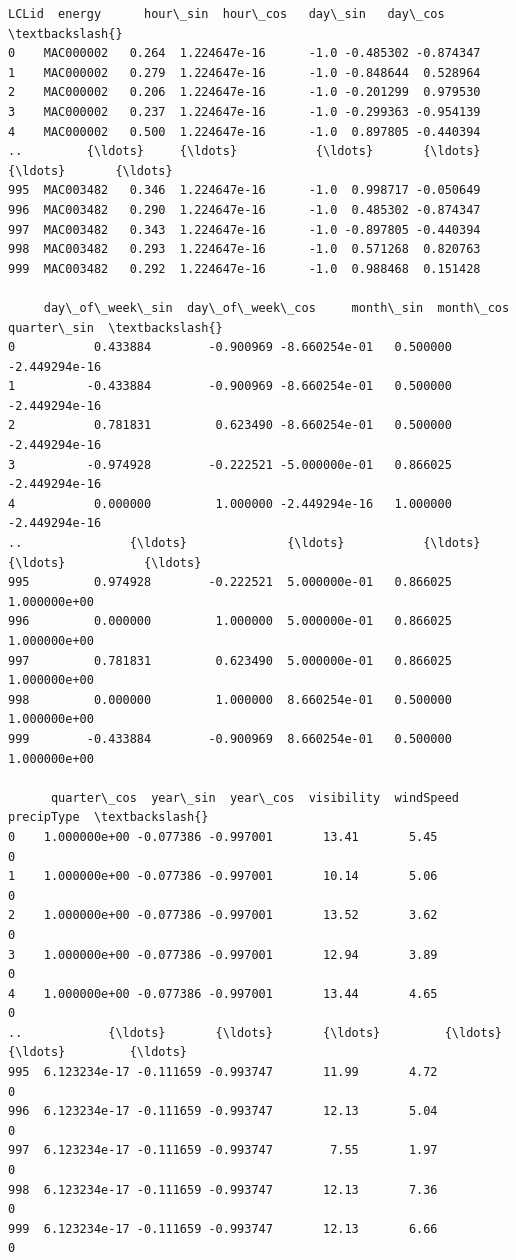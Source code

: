 \documentclass[11pt]{article}
\makeatletter
\newcommand{\boxspacing}{\kern\kvtcb@left@rule\kern\kvtcb@boxsep}
\newcommand{\prompt}[4]{
        {\ttfamily\llap{{\color{#2}[#3]:\hspace{3pt}#4}}\vspace{-\baselineskip}}
    }
\makeatother
\begin{document}
            \begin{tcolorbox}[breakable, size=fbox, boxrule=.5pt, pad at break*=1mm, opacityfill=0]
\prompt{Out}{outcolor}{172}{\boxspacing}
\begin{Verbatim}[commandchars=\\\{\}]
         LCLid  energy      hour\_sin  hour\_cos   day\_sin   day\_cos  \textbackslash{}
0    MAC000002   0.264  1.224647e-16      -1.0 -0.485302 -0.874347
1    MAC000002   0.279  1.224647e-16      -1.0 -0.848644  0.528964
2    MAC000002   0.206  1.224647e-16      -1.0 -0.201299  0.979530
3    MAC000002   0.237  1.224647e-16      -1.0 -0.299363 -0.954139
4    MAC000002   0.500  1.224647e-16      -1.0  0.897805 -0.440394
..         {\ldots}     {\ldots}           {\ldots}       {\ldots}       {\ldots}       {\ldots}
995  MAC003482   0.346  1.224647e-16      -1.0  0.998717 -0.050649
996  MAC003482   0.290  1.224647e-16      -1.0  0.485302 -0.874347
997  MAC003482   0.343  1.224647e-16      -1.0 -0.897805 -0.440394
998  MAC003482   0.293  1.224647e-16      -1.0  0.571268  0.820763
999  MAC003482   0.292  1.224647e-16      -1.0  0.988468  0.151428

     day\_of\_week\_sin  day\_of\_week\_cos     month\_sin  month\_cos   quarter\_sin  \textbackslash{}
0           0.433884        -0.900969 -8.660254e-01   0.500000 -2.449294e-16
1          -0.433884        -0.900969 -8.660254e-01   0.500000 -2.449294e-16
2           0.781831         0.623490 -8.660254e-01   0.500000 -2.449294e-16
3          -0.974928        -0.222521 -5.000000e-01   0.866025 -2.449294e-16
4           0.000000         1.000000 -2.449294e-16   1.000000 -2.449294e-16
..               {\ldots}              {\ldots}           {\ldots}        {\ldots}           {\ldots}
995         0.974928        -0.222521  5.000000e-01   0.866025  1.000000e+00
996         0.000000         1.000000  5.000000e-01   0.866025  1.000000e+00
997         0.781831         0.623490  5.000000e-01   0.866025  1.000000e+00
998         0.000000         1.000000  8.660254e-01   0.500000  1.000000e+00
999        -0.433884        -0.900969  8.660254e-01   0.500000  1.000000e+00

      quarter\_cos  year\_sin  year\_cos  visibility  windSpeed  precipType  \textbackslash{}
0    1.000000e+00 -0.077386 -0.997001       13.41       5.45           0
1    1.000000e+00 -0.077386 -0.997001       10.14       5.06           0
2    1.000000e+00 -0.077386 -0.997001       13.52       3.62           0
3    1.000000e+00 -0.077386 -0.997001       12.94       3.89           0
4    1.000000e+00 -0.077386 -0.997001       13.44       4.65           0
..            {\ldots}       {\ldots}       {\ldots}         {\ldots}        {\ldots}         {\ldots}
995  6.123234e-17 -0.111659 -0.993747       11.99       4.72           0
996  6.123234e-17 -0.111659 -0.993747       12.13       5.04           0
997  6.123234e-17 -0.111659 -0.993747        7.55       1.97           0
998  6.123234e-17 -0.111659 -0.993747       12.13       7.36           0
999  6.123234e-17 -0.111659 -0.993747       12.13       6.66           0


\end{Verbatim}
\end{tcolorbox}
\end{document}
